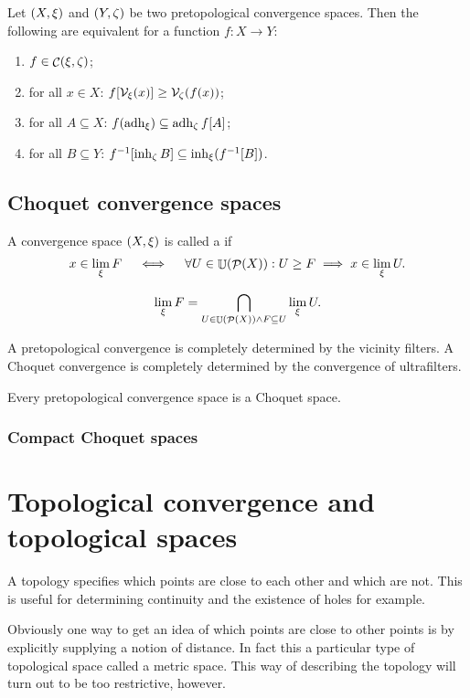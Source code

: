 \begin{proposition}
Let $\left( X,\xi \right)$ and $\left( Y,\zeta \right)$ be two pretopological convergence spaces. Then the following are equivalent for a function $f: X\to Y$:
\begin{enumerate}
\item $f\in \mathop{\mathcal{C}}(\xi, \zeta)$;
\item for all $x\in X$: $f[\mathcal{V}_\xi(x)] \geq \mathcal{V}_\zeta(f(x))$;
\item for all $A\subseteq X$: $f(\operatorname{adh}_\xi) \subseteq \operatorname{adh}_\zeta f[A]$;
\item for all $B\subseteq Y$: $f^{-1}[\operatorname{inh}_\zeta B] \subseteq \operatorname{inh}_\xi(f^{-1}[B])$.
\end{enumerate}
\end{proposition}

\section{Choquet convergence spaces}
\begin{definition}
A convergence space $\left( X, \xi \right)$ is called a  if
\[ x\in \lim_\xi F \quad\iff\quad \forall U\in \mathop{\mathbb{U}}(\mathop{\mathcal{P}}(X)): U \geq F \implies x\in\lim_\xi U. \]
\end{definition}

\[ \lim_\xi F = \bigcap_{U\in \mathop{\mathbb{U}}(\mathop{\mathcal{P}}(X))\land F \subseteq U}\lim_\xi U. \]

A pretopological convergence is completely determined by the vicinity filters. A Choquet convergence is completely determined by the convergence of ultrafilters.

\begin{lemma}
Every pretopological convergence space is a Choquet space.
\end{lemma}

\subsection{Compact Choquet spaces}

\chapter{Topological convergence and topological spaces}
A topology specifies which points are close to each other and which are not. This is useful for determining continuity and the existence of holes for example.

Obviously one way to get an idea of which points are close to other points is by explicitly supplying a notion of distance. In fact this a particular type of topological space called a metric space. This way of describing the topology will turn out to be too restrictive, however.

